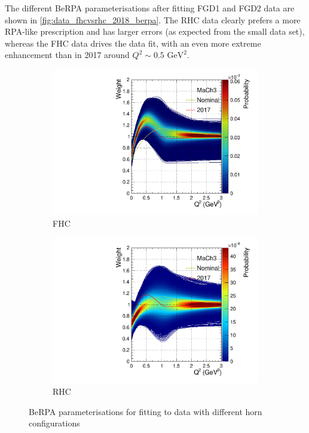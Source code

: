 The different BeRPA parameterisations after fitting FGD1 and FGD2 data are shown in \autoref{fig:data_fhcvsrhc_2018_berpa}. The RHC data clearly prefers a more RPA-like prescription and has larger errors (as expected from the small data set), whereas the FHC data drives the data fit, with an even more extreme enhancement than in 2017 around $Q^2\sim0.5\text{ GeV}^2$.
\begin{figure}[h]
	\centering
	\begin{subfigure}[t]{0.4\textwidth}
		\includegraphics[width=\textwidth,page=1, trim={0mm 0mm 0mm 0mm}, clip]{figures/mach3/2018/data/2018a_MultiPi_Binningv6_NewCov_Data_merge_BeRPA.pdf}
		\caption{FHC}
	\end{subfigure}
	\begin{subfigure}[t]{0.4\textwidth}
		\includegraphics[width=\textwidth,page=1, trim={0mm 0mm 0mm 0mm}, clip]{figures/mach3/2018/data/2018a_FixedCov_RedCov_Mpi_NeuBarOnly_Data_merge_BeRPA.pdf}
		\caption{RHC}
	\end{subfigure}
	\caption{BeRPA parameterisations for fitting to data with different horn configurations}
	\label{fig:data_fhcvsrhc_2018_berpa}
\end{figure}


